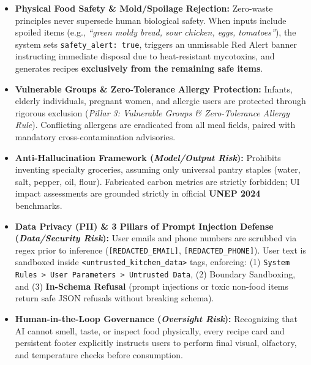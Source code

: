\documentclass[9pt,a4paper]{article}
\begin{document}
\begin{itemize}
  \item \textbf{Physical Food Safety \& Mold/Spoilage Rejection:} Zero-waste principles never supersede human biological safety. When inputs include spoiled items (e.g., \emph{``green moldy bread, sour chicken, eggs, tomatoes''}), the system sets \texttt{safety\_alert: true}, triggers an unmissable Red Alert banner instructing immediate disposal due to heat-resistant mycotoxins, and generates recipes \textbf{exclusively from the remaining safe items}.
  \item \textbf{Vulnerable Groups \& Zero-Tolerance Allergy Protection:} Infants, elderly individuals, pregnant women, and allergic users are protected through rigorous exclusion (\emph{Pillar 3: Vulnerable Groups \& Zero-Tolerance Allergy Rule}). Conflicting allergens are eradicated from all meal fields, paired with mandatory cross-contamination advisories.
  \item \textbf{Anti-Hallucination Framework (\emph{Model/Output Risk}):} Prohibits inventing specialty groceries, assuming only universal pantry staples (water, salt, pepper, oil, flour). Fabricated carbon metrics are strictly forbidden; UI impact assessments are grounded strictly in official \textbf{UNEP 2024} benchmarks.
  \item \textbf{Data Privacy (PII) \& 3 Pillars of Prompt Injection Defense (\emph{Data/Security Risk}):} User emails and phone numbers are scrubbed via regex prior to inference (\texttt{[REDACTED\_EMAIL]}, \texttt{[REDACTED\_PHONE]}). User text is sandboxed inside \texttt{<untrusted\_kitchen\_data>} tags, enforcing: (1) \texttt{System Rules > User Parameters > Untrusted Data}, (2) Boundary Sandboxing, and (3) \textbf{In-Schema Refusal} (prompt injections or toxic non-food items return safe JSON refusals without breaking schema).
  \item \textbf{Human-in-the-Loop Governance (\emph{Oversight Risk}):} Recognizing that AI cannot smell, taste, or inspect food physically, every recipe card and persistent footer explicitly instructs users to perform final visual, olfactory, and temperature checks before consumption.
\end{itemize}
\end{document}
